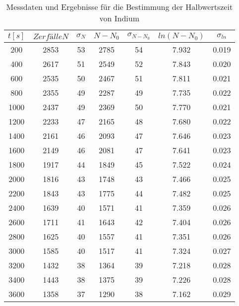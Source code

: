 \begin{table}[htbp]
\centering\begin{tabular}{c|c|c|c|c|c|c}
$t [s]$ & $Zerfälle N$ & $\sigma_N$ & $N-N_0$ & $\sigma_{N-N_0}$ & $ln(N-N_0)$ & $\sigma_{ln}$\\
\hline \hline
200&	2853&	53&	2785&	54&	7.932&	0.019\\
400&  2617&	51&	2549&	52&	7.843&	0.020\\
600&	2535&	50&	2467&	51&	7.811&	0.021\\
800&	2355&	49&	2287&	49&	7.735&	0.022\\
1000&	2437&	49&	2369&	50&	7.770&	0.021\\
1200&	2233&	47&	2165&	48&	7.680&  0.022\\
1400&	2161&	46&	2093&	47&	7.646&	0.023\\
1600&	2149&	46&	2081&	47&	7.641&	0.023\\
1800&	1917&	44&	1849&	45&	7.522&	0.024\\
2000&	1816&	43&	1748&	43&	7.466&	0.025\\
2200&	1843&	43&	1775&	44&	7.482&	0.025\\
2400&	1639&	40&	1571&	41&	7.359&	0.026\\
2600&	1711&	41&	1643&	42&	7.404&	0.026\\
2800&	1625&	40&	1557&	41&	7.351&	0.026\\
3000&	1585&	40&	1517&	41&	7.324&	0.027\\
3200&	1432&	38&	1364&	39&	7.218&	0.028\\
3400&	1443&	38&	1375&	39&	7.226&	0.028\\
3600&	1358&	37&	1290&	38&	7.162&	0.029\\

\end{tabular}
\caption{Messdaten und Ergebnisse für die Bestimmung der Halbwertszeit von Indium}
\label{fig:Tab1}
\end{table}